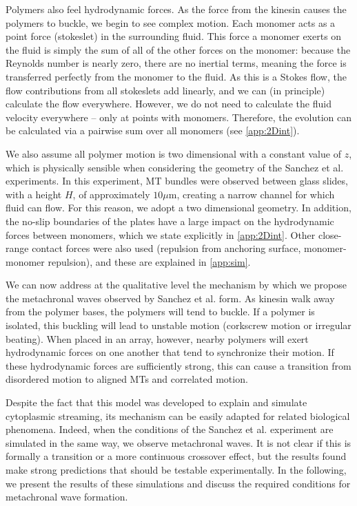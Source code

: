 \documentclass[11pt]{ucthesis}
\begin{document}
Polymers also feel hydrodynamic forces.
As the force from the kinesin causes the polymers to buckle, we
begin to see complex motion. Each monomer acts as a point force
(stokeslet) in the surrounding fluid. This force a monomer exerts
on the fluid is simply the sum of all of the other forces on the
monomer: because the Reynolds number is nearly zero, there are no
inertial terms, meaning the force is transferred perfectly from the
monomer to the fluid. As this is a Stokes flow, the flow contributions
from all stokeslets add linearly, and we can (in principle) calculate
the flow everywhere. However, we do not need to calculate the fluid
velocity everywhere -- only at points with monomers. 
Therefore, the evolution can be calculated via a pairwise sum over
all monomers (see \ref{app:2Dint}).

We also assume all polymer motion is two dimensional with a constant value of $z$, which
is physically sensible when considering the geometry of the Sanchez et al.
experiments. In this experiment, MT bundles were observed between
glass slides, with a height $H$, of approximately $10 \mu$m, creating a narrow channel for which fluid can flow.
For this reason, we adopt a two dimensional geometry. In addition,
the no-slip boundaries
of the plates have a large impact on the hydrodynamic forces between
monomers\cite{Blake1971,Liron1976}, which we state explicitly in \ref{app:2Dint}. Other close-range contact forces were
also used (repulsion from anchoring surface, monomer-monomer
repulsion), and these are explained in \ref{app:sim}.

We can now address at the qualitative level the mechanism by which
we propose the metachronal waves observed by Sanchez et al. form.
As kinesin walk away from the polymer bases, the polymers will tend
to buckle. If a polymer is isolated, this buckling will lead to
unstable motion (corkscrew motion or irregular
beating)\cite{Monteith2016}. When placed in an array,
however, nearby polymers will exert hydrodynamic forces on one
another that tend to synchronize their motion. If these hydrodynamic
forces are sufficiently strong, this can cause a transition from
disordered motion to aligned MTs and correlated motion. 

Despite the fact that this model was developed to explain and
simulate cytoplasmic streaming, its mechanism 
can be easily adapted for related biological phenomena. Indeed,
when the conditions of the Sanchez et al. experiment are simulated
in the same way, we observe metachronal waves.
It is not clear if this is formally a transition or a more continuous
crossover effect, but the results found make strong predictions
that should be testable experimentally.
In the following, we present
the results of these simulations and discuss the required conditions
for metachronal wave formation. 
\end{document}
